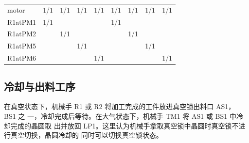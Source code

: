 \begin{table}[H]
{\begin{tabular}{l|llllllll}
				motor    & 1/1       & 1/1       & 1/1       & 1/1       & 1/1       & 1/1       & 1/1       & 1/1       \\
				R1atPM1  & 1/1       &           &           &           & 1/1       &           &           &           \\
				R1atPM2  &           & 1/1       &           &           &           & 1/1       &           &           \\
				R1atPM5  &           &           & 1/1       &           &           &           & 1/1       &           \\
				R1atPM6  &           &           &           & 1/1       &           &           &           & 1/1       \\
				\bottomrule
			\end{tabular}
		}
\end{table}

\subsection{冷却与出料工序}
在真空状态下，机械手 R1 或 R2 将加工完成的工件放进真空锁出料口 AS1， BS1 之
一，冷却完成后等待。在大气状态下，机械手 TM1 将 AS1 或 BS1 中冷却完成的晶圆取
出并放回 LP1。这里认为机械手拿取真空锁中晶圆时真空锁不进行真空切换，晶圆冷却的
同时可以切换真空锁状态。

